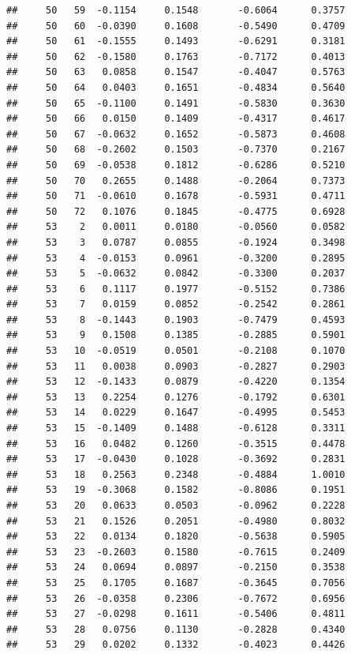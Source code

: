 \documentclass[
]{article}
\begin{document}
\begin{verbatim}
##     50   59  -0.1154     0.1548       -0.6064      0.3757  
##     50   60  -0.0390     0.1608       -0.5490      0.4709  
##     50   61  -0.1555     0.1493       -0.6291      0.3181  
##     50   62  -0.1580     0.1763       -0.7172      0.4013  
##     50   63   0.0858     0.1547       -0.4047      0.5763  
##     50   64   0.0403     0.1651       -0.4834      0.5640  
##     50   65  -0.1100     0.1491       -0.5830      0.3630  
##     50   66   0.0150     0.1409       -0.4317      0.4617  
##     50   67  -0.0632     0.1652       -0.5873      0.4608  
##     50   68  -0.2602     0.1503       -0.7370      0.2167  
##     50   69  -0.0538     0.1812       -0.6286      0.5210  
##     50   70   0.2655     0.1488       -0.2064      0.7373  
##     50   71  -0.0610     0.1678       -0.5931      0.4711  
##     50   72   0.1076     0.1845       -0.4775      0.6928  
##     53    2   0.0011     0.0180       -0.0560      0.0582  
##     53    3   0.0787     0.0855       -0.1924      0.3498  
##     53    4  -0.0153     0.0961       -0.3200      0.2895  
##     53    5  -0.0632     0.0842       -0.3300      0.2037  
##     53    6   0.1117     0.1977       -0.5152      0.7386  
##     53    7   0.0159     0.0852       -0.2542      0.2861  
##     53    8  -0.1443     0.1903       -0.7479      0.4593  
##     53    9   0.1508     0.1385       -0.2885      0.5901  
##     53   10  -0.0519     0.0501       -0.2108      0.1070  
##     53   11   0.0038     0.0903       -0.2827      0.2903  
##     53   12  -0.1433     0.0879       -0.4220      0.1354  
##     53   13   0.2254     0.1276       -0.1792      0.6301  
##     53   14   0.0229     0.1647       -0.4995      0.5453  
##     53   15  -0.1409     0.1488       -0.6128      0.3311  
##     53   16   0.0482     0.1260       -0.3515      0.4478  
##     53   17  -0.0430     0.1028       -0.3692      0.2831  
##     53   18   0.2563     0.2348       -0.4884      1.0010  
##     53   19  -0.3068     0.1582       -0.8086      0.1951  
##     53   20   0.0633     0.0503       -0.0962      0.2228  
##     53   21   0.1526     0.2051       -0.4980      0.8032  
##     53   22   0.0134     0.1820       -0.5638      0.5905  
##     53   23  -0.2603     0.1580       -0.7615      0.2409  
##     53   24   0.0694     0.0897       -0.2150      0.3538  
##     53   25   0.1705     0.1687       -0.3645      0.7056  
##     53   26  -0.0358     0.2306       -0.7672      0.6956  
##     53   27  -0.0298     0.1611       -0.5406      0.4811  
##     53   28   0.0756     0.1130       -0.2828      0.4340  
##     53   29   0.0202     0.1332       -0.4023      0.4426  

\end{verbatim}
\end{document}
